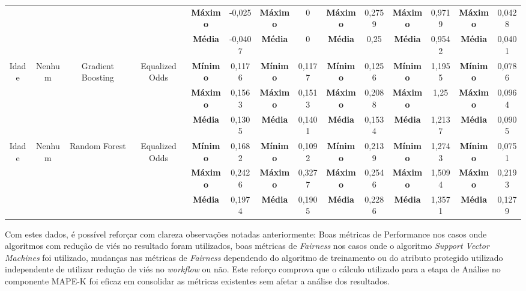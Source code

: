 \documentclass[portugues]{ic-tese}
\begin{document}
\begin{table}[H]
\begin{center}
{\begin{tabular}{c|c|c|c|c|c|c|c|c|c|c|c|c|c}
             & & & & \textbf{Máximo} & -0,025 & \textbf{Máximo} & 0 & \textbf{Máximo} & 0,2759 & \textbf{Máximo} & 0,9719 & \textbf{Máximo} & 0,0428 \\
             & & & & \textbf{Média} & -0,0407 & \textbf{Média} & 0 & \textbf{Média} & 0,25 & \textbf{Média} & 0,9542 & \textbf{Média} & 0,0401 \\
            \hline
            \multirow{3}{*}{Idade} & \multirow{3}{*}{Nenhum} & \multirow{3}{*}{Gradient Boosting} & \multirow{3}{*}{Equalized Odds} & \textbf{Mínimo} & 0,1176 & \textbf{Mínimo} & 0,1177 & \textbf{Mínimo} & 0,1256 & \textbf{Mínimo} & 1,1955 & \textbf{Mínimo} & 0,0786 \\
             & & & & \textbf{Máximo} & 0,1563 & \textbf{Máximo} & 0,1513 & \textbf{Máximo} & 0,2088 & \textbf{Máximo} & 1,25 & \textbf{Máximo} & 0,0964 \\
             & & & & \textbf{Média} & 0,1305 & \textbf{Média} & 0,1401 & \textbf{Média} & 0,1534 & \textbf{Média} & 1,2137 & \textbf{Média} & 0,0905 \\
            \hline
            \multirow{3}{*}{Idade} & \multirow{3}{*}{Nenhum} & \multirow{3}{*}{Random Forest} & \multirow{3}{*}{Equalized Odds} & \textbf{Mínimo} & 0,1682 & \textbf{Mínimo} & 0,1092 & \textbf{Mínimo} & 0,2139 & \textbf{Mínimo} & 1,2743 & \textbf{Mínimo} & 0,0751 \\
             & & & & \textbf{Máximo} & 0,2426 & \textbf{Máximo} & 0,3277 & \textbf{Máximo} & 0,2546 & \textbf{Máximo} & 1,5094 & \textbf{Máximo} & 0,2193 \\
             & & & & \textbf{Média} & 0,1974 & \textbf{Média} & 0,1905 & \textbf{Média} & 0,2286 & \textbf{Média} & 1,3571 & \textbf{Média} & 0,1279 \\
            \end{tabular}}
        \end{center}
    \end{table}

Com estes dados, é possível reforçar com clareza observações notadas anteriormente: Boas métricas de Performance nos casos onde algoritmos com redução de viés no resultado foram utilizados, boas métricas de \textit{Fairness} nos casos onde o algoritmo \textit{Support Vector Machines} foi utilizado, mudanças nas métricas de \textit{Fairness} dependendo do algoritmo de treinamento ou do atributo protegido utilizado independente de utilizar redução de viés no \textit{workflow} ou não. Este reforço comprova que o cálculo utilizado para a etapa de Análise no componente MAPE-K foi eficaz em consolidar as métricas existentes sem afetar a análise dos resultados.
\end{document}
